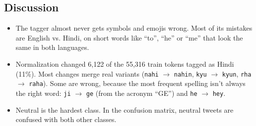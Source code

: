 \subsection*{Discussion}
\begin{itemize}
    \item The tagger almost never gets symbols and emojis wrong. Most of its mistakes are English vs. Hindi, on short words like ``to'', ``he'' or ``me'' that look the same in both languages.
    \item Normalization changed 6,122 of the 55,316 train tokens tagged as Hindi (11\%). Most changes merge real variants (\texttt{nahi} $\rightarrow$ \texttt{nahin}, \texttt{kyu} $\rightarrow$ \texttt{kyun}, \texttt{rha} $\rightarrow$ \texttt{raha}). Some are wrong, because the most frequent spelling isn't always the right word: \texttt{ji} $\rightarrow$ \texttt{ge} (from the acronym ``GE'') and \texttt{he} $\rightarrow$ \texttt{hey}.
    \item Neutral is the hardest class. In the confusion matrix, neutral tweets are confused with both other classes.
\end{itemize}
